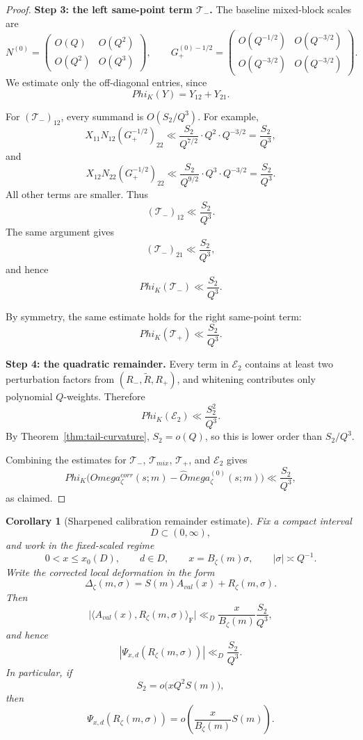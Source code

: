 \documentclass[11pt,a4paper]{amsart}
\def\Omega{Omega}%
\def\Phi{Phi}%
\def\corr{corr}%
\def\val{val}%
\def\mix{mix}%
\theoremstyle{plain}
\newtheorem{corollary}[theorem]{Corollary}
\theoremstyle{definition}
\newcommand{\val}{\mathrm{val}}
\newcommand{\corr}{\mathrm{corr}}
\newcommand{\mix}{\mathrm{mix}}
\newcommand{\F}{\mathrm{F}}
\begin{document}
\begin{proof}
\medskip
\noindent
\textbf{Step 3: the left same-point term $\mathcal T_-$.}
The baseline mixed-block scales are
\[
N^{(0)}=
\begin{pmatrix}
O(Q) & O(Q^2)\\
O(Q^2) & O(Q^3)
\end{pmatrix},
\qquad
G_+^{(0)-1/2}=
\begin{pmatrix}
O(Q^{-1/2}) & O(Q^{-3/2})\\
O(Q^{-3/2}) & O(Q^{-3/2})
\end{pmatrix}.
\]
We estimate only the off-diagonal entries, since
\[
\Phi_K(Y)=Y_{12}+Y_{21}.
\]

For $(\mathcal T_-)_{12}$, every summand is $O(S_2/Q^3)$. For example,
\[
X_{11}N_{12}(G_+^{-1/2})_{22}
\ll
\frac{S_2}{Q^{7/2}}\cdot Q^2\cdot Q^{-3/2}
=
\frac{S_2}{Q^3},
\]
and
\[
X_{12}N_{22}(G_+^{-1/2})_{22}
\ll
\frac{S_2}{Q^{9/2}}\cdot Q^3\cdot Q^{-3/2}
=
\frac{S_2}{Q^3}.
\]
All other terms are smaller. Thus
\[
(\mathcal T_-)_{12}\ll \frac{S_2}{Q^3}.
\]
The same argument gives
\[
(\mathcal T_-)_{21}\ll \frac{S_2}{Q^3},
\]
and hence
\[
\Phi_K(\mathcal T_-)\ll \frac{S_2}{Q^3}.
\]

By symmetry, the same estimate holds for the right same-point term:
\[
\Phi_K(\mathcal T_+)\ll \frac{S_2}{Q^3}.
\]

\medskip
\noindent
\textbf{Step 4: the quadratic remainder.}
Every term in $\mathcal E_2$ contains at least two perturbation factors from
$(R_-,\widetilde R,R_+)$, and whitening contributes only polynomial
$Q$-weights. Therefore
\[
\Phi_K(\mathcal E_2)\ll \frac{S_2^2}{Q^3}.
\]
By Theorem~\ref{thm:tail-curvature}, $S_2=o(Q)$, so this is lower order than
$S_2/Q^3$.

Combining the estimates for $\mathcal T_-$, $\mathcal T_{\mix}$,
$\mathcal T_+$, and $\mathcal E_2$ gives
\[
\Phi_K\!\bigl(\widehat\Omega_\zeta^{\corr}(s;m)-\widehat\Omega_\zeta^{(0)}(s;m)\bigr)
\ll
\frac{S_2}{Q^3},
\]
as claimed.
\end{proof}

\begin{corollary}[Sharpened calibration remainder estimate]
\label{cor:sharpened-calibration-remainder}
Fix a compact interval
\[
D\subset(0,\infty),
\]
and work in the fixed-scaled regime
\[
0<x\le x_0(D),\qquad d\in D,\qquad x=B_\zeta(m)\sigma,\qquad |\sigma|\asymp Q^{-1}.
\]
Write the corrected local deformation in the form
\[
\Delta_\zeta(m,\sigma)=S(m)A_{\val}(x)+R_\zeta(m,\sigma).
\]
Then
\[
\bigl|\langle A_{\val}(x),R_\zeta(m,\sigma)\rangle_\F\bigr|
\ll_D
\frac{x}{B_\zeta(m)}\frac{S_2}{Q^3},
\]
and hence
\[
\boxed{
|\Psi_{x,d}(R_\zeta(m,\sigma))|
\ll_D
\frac{S_2}{Q^3}.
}
\]
In particular, if
\[
S_2=o\!\bigl(xQ^2S(m)\bigr),
\]
then
\[
\Psi_{x,d}(R_\zeta(m,\sigma))
=
o\!\left(\frac{x}{B_\zeta(m)}S(m)\right).
\]
\end{corollary}
\end{document}
